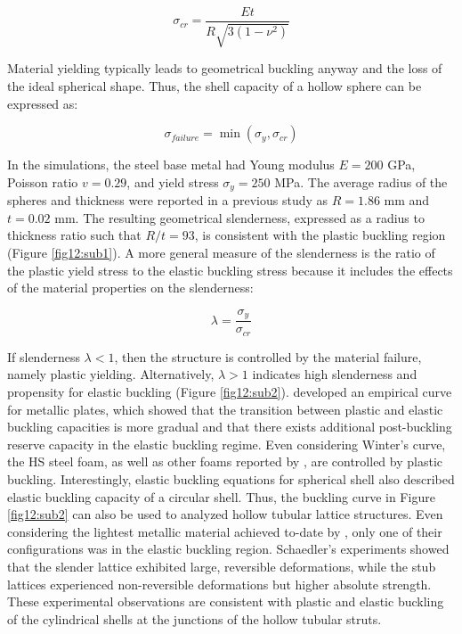 \documentclass[review]{elsarticle}
\begin{document}
{\begin{equation}\label{Eq3}
\sigma_{cr}=\frac{Et}{R\sqrt{3(1-\nu^2)}}
\end{equation}


Material yielding typically leads to geometrical buckling anyway and the loss of the ideal spherical shape. Thus, the shell capacity of a hollow sphere can be expressed as:

\begin{equation}\label{Eq4}
\sigma_{failure}=\min(\sigma_y,\sigma_{cr})
\end{equation}


In the simulations, the steel base metal had Young modulus $E=200$ GPa, Poisson ratio $v=0.29$, and yield stress $\sigma_y=250$ MPa. The average radius of the spheres and thickness were reported in a previous study \cite{Szyniszewskietal2014} as $R = 1.86$ mm and $t = 0.02$ mm. The resulting geometrical slenderness, expressed as a radius to thickness ratio such that $R/t = 93$, is consistent with the plastic buckling region (Figure \ref{fig12:sub1}). A more general measure of the slenderness is the ratio of the plastic yield stress to the elastic buckling stress because it includes the effects of the material properties on the slenderness:

\begin{equation}\label{Eq5}
\lambda=\frac{\sigma_y}{\sigma_{cr}}
\end{equation}

If slenderness $\lambda<1$, then the structure is controlled by the material failure, namely plastic yielding. Alternatively, $\lambda>1$ indicates high slenderness and propensity for elastic buckling (Figure \ref{fig12:sub2}). \cite{Winter1947} developed an empirical curve for metallic plates, which showed that the transition between plastic and elastic buckling capacities is more gradual and that there exists additional post-buckling reserve capacity in the elastic buckling regime. Even considering Winter’s curve, the HS steel foam, as well as other foams reported by \cite{Fallet2008}, are controlled by plastic buckling. Interestingly, elastic buckling equations for spherical shell also described elastic buckling capacity of a circular shell. Thus, the buckling curve in Figure \ref{fig12:sub2} can also be used to analyzed hollow tubular lattice structures. Even considering the lightest metallic material achieved to-date by \cite{Sch2011}, only one of their configurations was in the elastic buckling region. Schaedler’s experiments showed that the slender lattice exhibited large, reversible deformations, while the stub lattices experienced non-reversible deformations but higher absolute strength. These experimental observations are consistent with plastic and elastic buckling of the cylindrical shells at the junctions of the hollow tubular struts.

}
\end{document}
